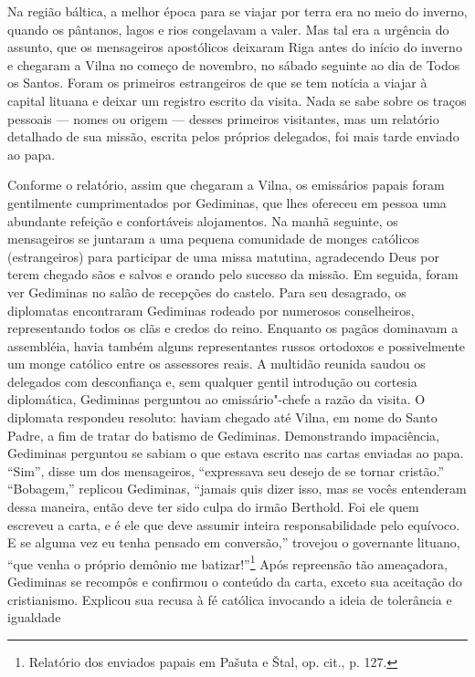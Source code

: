 Na região báltica, a melhor época para se viajar por terra era no meio
do inverno, quando os pântanos, lagos e rios congelavam a valer. Mas tal
era a urgência do assunto, que os mensageiros apostólicos deixaram Riga
antes do início do inverno e chegaram a Vilna no começo de novembro, no
sábado seguinte ao dia de Todos os Santos. Foram os primeiros
estrangeiros de que se tem notícia a viajar à capital lituana e deixar
um registro escrito da visita. Nada se sabe sobre os traços pessoais ---
nomes ou origem --- desses primeiros visitantes, mas um relatório
detalhado de sua missão, escrita pelos próprios delegados, foi mais
tarde enviado ao papa.

Conforme o relatório, assim que chegaram a Vilna, os emissários papais
foram gentilmente cumprimentados por Gediminas, que lhes ofereceu em
pessoa uma abundante refeição e confortáveis alojamentos. Na manhã
seguinte, os mensageiros se juntaram a uma pequena comunidade de monges
católicos (estrangeiros) para participar de uma missa matutina,
agradecendo Deus por terem chegado sãos e salvos e orando pelo sucesso
da missão. Em seguida, foram ver Gediminas no salão de recepções do
castelo. Para seu desagrado, os diplomatas encontraram Gediminas rodeado
por numerosos conselheiros, representando todos os clãs e credos do
reino. Enquanto os pagãos dominavam a assembléia, havia também alguns
representantes russos ortodoxos e possivelmente um monge católico entre
os assessores reais. A multidão reunida saudou os delegados com
desconfiança e, sem qualquer gentil introdução ou cortesia diplomática,
Gediminas perguntou ao emissário"-chefe a razão da visita. O diplomata
respondeu resoluto: haviam chegado até Vilna, em nome do Santo Padre, a
fim de tratar do batismo de Gediminas. Demonstrando impaciência,
Gediminas perguntou se sabiam o que estava escrito nas cartas enviadas
ao papa. ``Sim'', disse um dos mensageiros, ``expressava seu desejo de
se tornar cristão.'' ``Bobagem,'' replicou Gediminas, ``jamais quis
dizer isso, mas se vocês entenderam dessa maneira, então deve ter sido
culpa do irmão Berthold. Foi ele quem escreveu a carta, e é ele que deve
assumir inteira responsabilidade pelo equívoco. E se alguma vez eu tenha
pensado em conversão,'' trovejou o governante lituano, ``que venha o
próprio demônio me batizar!''\footnote{Relatório dos enviados papais em Pašuta e Štal, op. cit., p. 127.}
Após repreensão tão ameaçadora, Gediminas se recompôs e confirmou o
conteúdo da carta, exceto sua aceitação do cristianismo. Explicou sua
recusa à fé católica invocando a ideia de tolerância e igualdade
